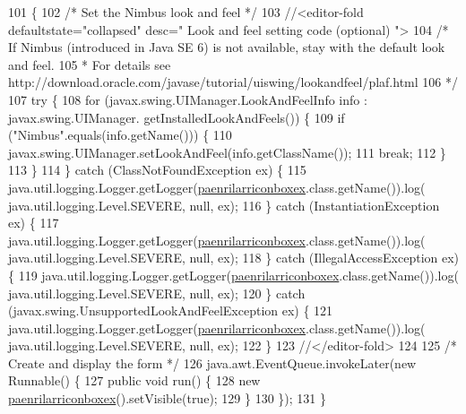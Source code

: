 \begin{DoxyCode}
101                                            \{
102         \textcolor{comment}{/* Set the Nimbus look and feel */}
103         \textcolor{comment}{//<editor-fold defaultstate="collapsed" desc=" Look and feel setting code (optional) ">}
104         \textcolor{comment}{/* If Nimbus (introduced in Java SE 6) is not available, stay with the default look and feel.}
105 \textcolor{comment}{         * For details see http://download.oracle.com/javase/tutorial/uiswing/lookandfeel/plaf.html }
106 \textcolor{comment}{         */}
107         \textcolor{keywordflow}{try} \{
108             \textcolor{keywordflow}{for} (javax.swing.UIManager.LookAndFeelInfo info : javax.swing.UIManager.
      getInstalledLookAndFeels()) \{
109                 \textcolor{keywordflow}{if} (\textcolor{stringliteral}{"Nimbus"}.equals(info.getName())) \{
110                     javax.swing.UIManager.setLookAndFeel(info.getClassName());
111                     \textcolor{keywordflow}{break};
112                 \}
113             \}
114         \} \textcolor{keywordflow}{catch} (ClassNotFoundException ex) \{
115             java.util.logging.Logger.getLogger(\mbox{\hyperlink{classinterfacessoguar_1_1paenrilarriconboxex_a0fef04e41b5c114819db99ee053c370e}{paenrilarriconboxex}}.class.getName()).log(
      java.util.logging.Level.SEVERE, null, ex);
116         \} \textcolor{keywordflow}{catch} (InstantiationException ex) \{
117             java.util.logging.Logger.getLogger(\mbox{\hyperlink{classinterfacessoguar_1_1paenrilarriconboxex_a0fef04e41b5c114819db99ee053c370e}{paenrilarriconboxex}}.class.getName()).log(
      java.util.logging.Level.SEVERE, null, ex);
118         \} \textcolor{keywordflow}{catch} (IllegalAccessException ex) \{
119             java.util.logging.Logger.getLogger(\mbox{\hyperlink{classinterfacessoguar_1_1paenrilarriconboxex_a0fef04e41b5c114819db99ee053c370e}{paenrilarriconboxex}}.class.getName()).log(
      java.util.logging.Level.SEVERE, null, ex);
120         \} \textcolor{keywordflow}{catch} (javax.swing.UnsupportedLookAndFeelException ex) \{
121             java.util.logging.Logger.getLogger(\mbox{\hyperlink{classinterfacessoguar_1_1paenrilarriconboxex_a0fef04e41b5c114819db99ee053c370e}{paenrilarriconboxex}}.class.getName()).log(
      java.util.logging.Level.SEVERE, null, ex);
122         \}
123         \textcolor{comment}{//</editor-fold>}
124 
125         \textcolor{comment}{/* Create and display the form */}
126         java.awt.EventQueue.invokeLater(\textcolor{keyword}{new} Runnable() \{
127             \textcolor{keyword}{public} \textcolor{keywordtype}{void} run() \{
128                 \textcolor{keyword}{new} \mbox{\hyperlink{classinterfacessoguar_1_1paenrilarriconboxex_a0fef04e41b5c114819db99ee053c370e}{paenrilarriconboxex}}().setVisible(\textcolor{keyword}{true});
129             \}
130         \});
131     \}
\end{DoxyCode}


